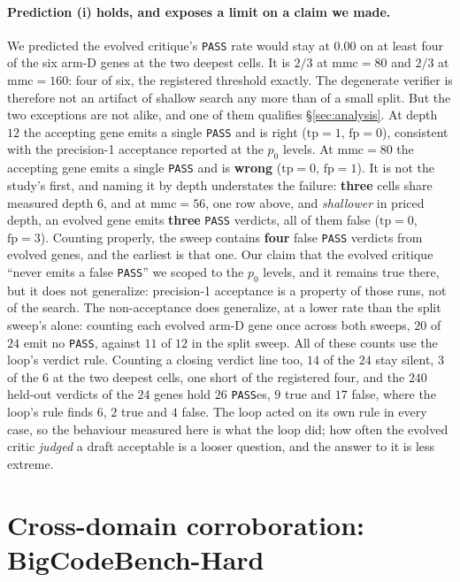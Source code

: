 \documentclass[11pt]{article}
\begin{document}
\paragraph{Prediction (i) holds, and exposes a limit on a claim we made.} We predicted the
evolved critique's \texttt{PASS} rate would stay at $0.00$ on at least four of the six arm-D
genes at the two deepest cells. It is $2/3$ at $\mathrm{mmc}=80$ and $2/3$ at
$\mathrm{mmc}=160$: four of six, the registered threshold exactly. The degenerate verifier is
therefore not an artifact of shallow search any more than of a small split. But the two
exceptions are not alike, and one of them qualifies \S\ref{sec:analysis}. At depth $12$ the
accepting gene emits a single \texttt{PASS} and is right ($\mathrm{tp}=1$, $\mathrm{fp}=0$),
consistent with the precision-1 acceptance reported at the $p_0$ levels. At $\mathrm{mmc}{=}80$ the
accepting gene emits a single \texttt{PASS} and is \textbf{wrong} ($\mathrm{tp}=0$,
$\mathrm{fp}=1$). It is not the study's first, and naming it by depth understates the failure:
\textbf{three} cells share measured depth $6$, and at $\mathrm{mmc}{=}56$, one row above, and
\emph{shallower} in priced depth, an evolved gene emits \textbf{three} \texttt{PASS} verdicts,
all of them false ($\mathrm{tp}=0$, $\mathrm{fp}=3$). Counting properly, the sweep contains
\textbf{four} false \texttt{PASS} verdicts from evolved genes, and the earliest is that one.
Our claim that the evolved critique ``never emits a false \texttt{PASS}'' we scoped to the $p_0$ levels, and it remains true there, but it does not generalize: precision-1 acceptance is a property
of those runs, not of the search. The non-acceptance does generalize, at a lower rate than the
split sweep's alone: counting each evolved arm-D gene once across both sweeps, $20$ of $24$ emit
no \texttt{PASS}, against $11$ of $12$ in the split sweep. All of these counts use the loop's
verdict rule. Counting a closing verdict line too, $14$ of the $24$ stay silent, $3$ of the $6$ at
the two deepest cells, one short of the registered four, and the $240$ held-out verdicts of the
$24$ genes hold $26$ \texttt{PASS}es, $9$ true and $17$ false, where the loop's rule finds $6$,
$2$ true and $4$ false. The loop acted on its own rule in every case, so the behaviour measured
here is what the loop did; how often the evolved critic \emph{judged} a draft acceptable is a
looser question, and the answer to it is less extreme.

\section{Cross-domain corroboration: BigCodeBench-Hard}
\label{sec:bcb}
\end{document}
